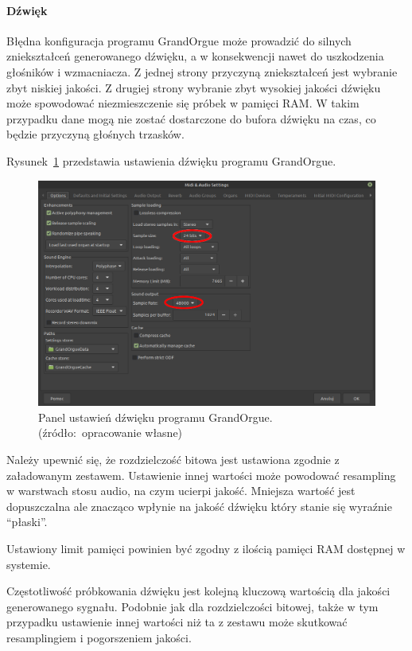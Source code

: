 \documentclass[11pt]{report}
\begin{document}
    \paragraph{Dźwięk}
    Błędna konfiguracja programu GrandOrgue może prowadzić do silnych zniekształceń generowanego dźwięku, a w konsekwencji nawet do uszkodzenia głośników i wzmacniacza.
    Z jednej strony przyczyną zniekształceń jest wybranie zbyt niskiej jakości.
    Z drugiej strony wybranie zbyt wysokiej jakości dźwięku może spowodować niezmieszczenie się próbek w pamięci RAM.
    W takim przypadku dane mogą nie zostać dostarczone do bufora dźwięku na czas, co będzie przyczyną głośnych trzasków.

    Rysunek~\ref{fig:ustawienia-dzwieku} przedstawia ustawienia dźwięku programu GrandOrgue.
    \begin{figure}[!ht]
        \centering
        \includegraphics[width=\linewidth]{fig/optionsR.png}
        \caption{Panel ustawień dźwięku programu GrandOrgue. (źródło:~opracowanie własne)}
        \label{fig:ustawienia-dzwieku}
    \end{figure}

    Należy upewnić się, że rozdzielczość bitowa jest ustawiona zgodnie z załadowanym zestawem.
    Ustawienie innej wartości może powodować resampling w warstwach stosu audio, na czym ucierpi jakość.
    Mniejsza wartość jest dopuszczalna ale znacząco wpłynie na jakość dźwięku który stanie się wyraźnie ``płaski''.

    Ustawiony limit pamięci powinien być zgodny z ilością pamięci RAM dostępnej w systemie.

    Częstotliwość próbkowania dźwięku jest kolejną kluczową wartością dla jakości generowanego sygnału.
    Podobnie jak dla rozdzielczości bitowej, także w tym przypadku ustawienie innej wartości niż ta z zestawu może skutkować resamplingiem i pogorszeniem jakości.
\end{document}
